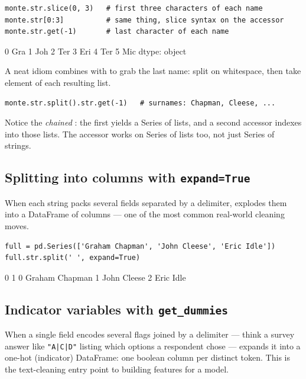 \documentclass[11pt]{article}
\begin{document}
\begin{lstlisting}
monte.str.slice(0, 3)   # first three characters of each name
monte.str[0:3]          # same thing, slice syntax on the accessor
monte.str.get(-1)       # last character of each name
\end{lstlisting}

\begin{outblock}
0    Gra
1    Joh
2    Ter
3    Eri
4    Ter
5    Mic
dtype: object
\end{outblock}

A neat idiom combines  with  to grab the last name: split on whitespace, then take element  of each resulting list.

\begin{lstlisting}
monte.str.split().str.get(-1)   # surnames: Chapman, Cleese, ...
\end{lstlisting}

Notice the \emph{chained} : the first  yields a Series of lists, and a second  accessor indexes into those lists. The  accessor works on Series of lists too, not just Series of strings.

\subsection{Splitting into columns with \texttt{expand=True}}

When each string packs several fields separated by a delimiter,  explodes them into a DataFrame of columns --- one of the most common real-world cleaning moves.

\begin{lstlisting}
full = pd.Series(['Graham Chapman', 'John Cleese', 'Eric Idle'])
full.str.split(' ', expand=True)
\end{lstlisting}

\begin{outblock}
        0        1
0  Graham  Chapman
1    John   Cleese
2    Eric     Idle
\end{outblock}

\subsection{Indicator variables with \texttt{get\_dummies}}

When a single field encodes several flags joined by a delimiter --- think a survey answer like \verb!"A|C|D"! listing which options a respondent chose ---  expands it into a one-hot (indicator) DataFrame: one boolean column per distinct token. This is the text-cleaning entry point to building features for a model.
\end{document}
